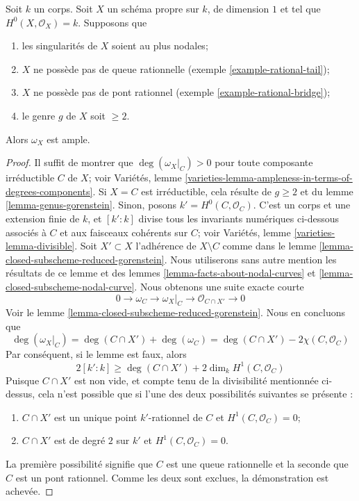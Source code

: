 \begin{lemma}
\label{lemma-no-rational-bridge-ample-genus-geq-2}
Soit $k$ un corps. Soit $X$ un schéma propre sur $k$, de dimension $1$ et tel que $H^0(X, \mathcal{O}_X) = k$. Supposons que \begin{enumerate} \item les singularités de $X$ soient au plus nodales; \item $X$ ne possède pas de queue rationnelle (exemple \ref{example-rational-tail}); \item $X$ ne possède pas de pont rationnel (exemple \ref{example-rational-bridge}); \item le genre $g$ de $X$ soit $\geq 2$. \end{enumerate} Alors $\omega_X$ est ample.
\end{lemma}

\begin{proof}
Il suffit de montrer que $\deg(\omega_X|_C) > 0$ pour toute composante irréductible $C$ de $X$; voir Variétés, lemme \ref{varieties-lemma-ampleness-in-terms-of-degrees-components}. Si $X = C$ est irréductible, cela résulte de $g \geq 2$ et du lemme \ref{lemma-genus-gorenstein}. Sinon, posons $k' = H^0(C, \mathcal{O}_C)$. C'est un corps et une extension finie de $k$, et $[k' : k]$ divise tous les invariants numériques ci-dessous associés à $C$ et aux faisceaux cohérents sur $C$; voir Variétés, lemme \ref{varieties-lemma-divisible}. Soit $X' \subset X$ l'adhérence de $X \setminus C$ comme dans le lemme \ref{lemma-closed-subscheme-reduced-gorenstein}. Nous utiliserons sans autre mention les résultats de ce lemme et des lemmes \ref{lemma-facts-about-nodal-curves} et \ref{lemma-closed-subscheme-nodal-curve}. Nous obtenons une suite exacte courte $$
0 \to \omega_C \to \omega_X|_C \to \mathcal{O}_{C \cap X'} \to 0
$$ Voir le lemme \ref{lemma-closed-subscheme-reduced-gorenstein}. Nous en concluons que $$
\deg(\omega_X|_C) = \deg(C \cap X') + \deg(\omega_C) =
\deg(C \cap X') - 2\chi(C, \mathcal{O}_C)
$$ Par conséquent, si le lemme est faux, alors $$
2[k' : k] \geq \deg(C \cap X') + 2\dim_k H^1(C, \mathcal{O}_C)
$$ Puisque $C \cap X'$ est non vide, et compte tenu de la divisibilité mentionnée ci-dessus, cela n'est possible que si l'une des deux possibilités suivantes se présente : \begin{enumerate} \item[(a)] $C \cap X'$ est un unique point $k'$-rationnel de $C$ et $H^1(C, \mathcal{O}_C) = 0$; \item[(b)] $C \cap X'$ est de degré $2$ sur $k'$ et $H^1(C, \mathcal{O}_C) = 0$. \end{enumerate} La première possibilité signifie que $C$ est une queue rationnelle et la seconde que $C$ est un pont rationnel. Comme les deux sont exclues, la démonstration est achevée.
\end{proof}


